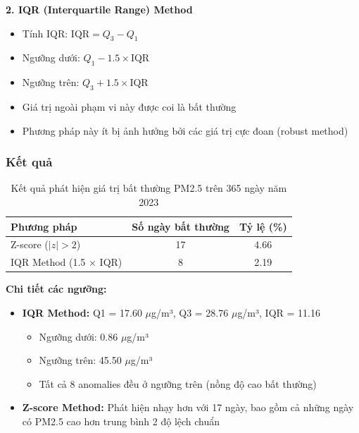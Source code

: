 \documentclass[12pt,a4paper]{article}
\begin{document}
\textbf{2. IQR (Interquartile Range) Method}
\begin{itemize}
    \item Tính IQR: $\text{IQR} = Q_3 - Q_1$
    \item Ngưỡng dưới: $Q_1 - 1.5 \times \text{IQR}$
    \item Ngưỡng trên: $Q_3 + 1.5 \times \text{IQR}$
    \item Giá trị ngoài phạm vi này được coi là bất thường
    \item Phương pháp này ít bị ảnh hưởng bởi các giá trị cực đoan (robust method)
\end{itemize}

\subsubsection{Kết quả}

\begin{table}[H]
\centering
\begin{tabular}{lcc}
\toprule
\textbf{Phương pháp} & \textbf{Số ngày bất thường} & \textbf{Tỷ lệ (\%)} \\
\midrule
Z-score ($|z| > 2$) & 17 & 4.66 \\
IQR Method (1.5 × IQR) & 8 & 2.19 \\
\bottomrule
\end{tabular}
\caption{Kết quả phát hiện giá trị bất thường PM2.5 trên 365 ngày năm 2023}
\end{table}

\textbf{Chi tiết các ngưỡng:}
\begin{itemize}
    \item \textbf{IQR Method:} Q1 = 17.60 $\mu$g/m³, Q3 = 28.76 $\mu$g/m³, IQR = 11.16
    \begin{itemize}
        \item Ngưỡng dưới: 0.86 $\mu$g/m³
        \item Ngưỡng trên: 45.50 $\mu$g/m³
        \item Tất cả 8 anomalies đều ở ngưỡng trên (nồng độ cao bất thường)
    \end{itemize}
    \item \textbf{Z-score Method:} Phát hiện nhạy hơn với 17 ngày, bao gồm cả những ngày có PM2.5 cao hơn trung bình 2 độ lệch chuẩn
\end{itemize}
\end{document}
